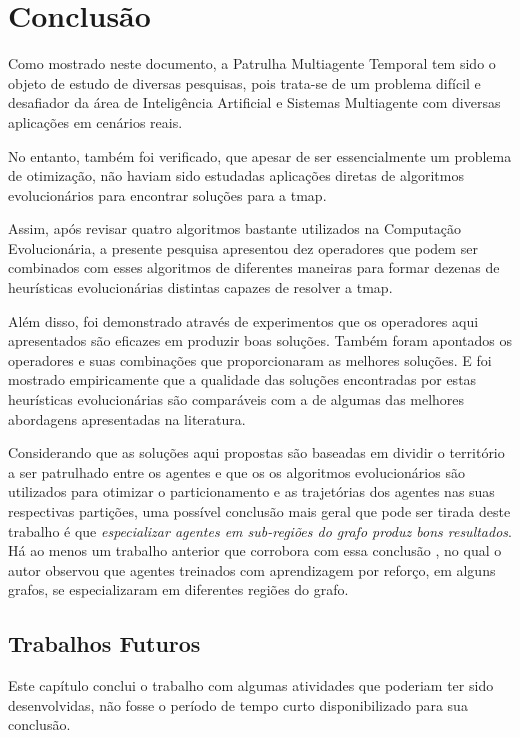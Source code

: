 \chapter{Conclusão}
\label{conclusao_final}

Como mostrado neste documento, a Patrulha Multiagente Temporal tem sido o objeto 
de estudo de diversas pesquisas, pois trata-se de um problema difícil e 
desafiador da área de Inteligência Artificial e Sistemas Multiagente com 
diversas aplicações em cenários reais.

No entanto, também foi verificado, que apesar de ser essencialmente um problema 
de otimização, não haviam sido estudadas aplicações diretas de algoritmos 
evolucionários para encontrar soluções para a \ac{tmap}.

Assim, após revisar quatro algoritmos bastante utilizados na Computação 
Evolucionária, a presente pesquisa apresentou dez operadores que podem ser 
combinados com esses algoritmos de diferentes maneiras para formar dezenas de 
heurísticas evolucionárias distintas capazes de resolver a \ac{tmap}.

Além disso, foi demonstrado através de experimentos que os operadores aqui 
apresentados são eficazes em produzir boas soluções. Também foram apontados 
os operadores e suas combinações que proporcionaram as melhores soluções. 
E foi mostrado empiricamente que a qualidade das soluções encontradas por estas 
heurísticas evolucionárias são comparáveis com a de algumas das melhores 
abordagens apresentadas na literatura.

Considerando que as soluções aqui propostas são baseadas em dividir o território 
a ser patrulhado entre os agentes e que os os algoritmos evolucionários são 
utilizados para otimizar o particionamento e as trajetórias dos agentes nas suas 
respectivas partições, uma possível conclusão mais geral que pode ser tirada 
deste trabalho é que \textit{especializar agentes em sub-regiões do grafo produz 
bons resultados}. Há ao menos um trabalho anterior que corrobora com essa 
conclusão \citep{1373634}, no qual o autor observou que agentes treinados com 
aprendizagem por reforço, em alguns grafos, se especializaram em diferentes 
regiões do grafo.

\section{Trabalhos Futuros}

Este capítulo conclui o trabalho com algumas atividades que poderiam ter sido 
desenvolvidas, não fosse o período de tempo curto disponibilizado para sua 
conclusão.

